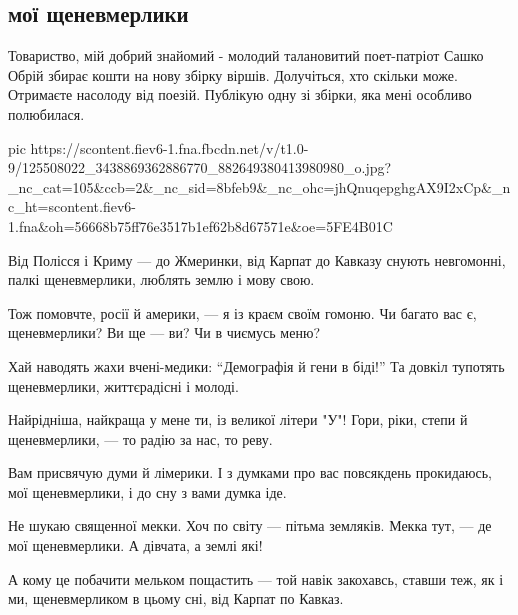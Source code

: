  
 
 
 
 
 
\subsection{мої щеневмерлики}
\label{sec:14_11_2020.fb.nitsoi_larysa.1.she_ne_vmerlyki}

Товариство, мій добрий знайомий - молодий талановитий поет-патріот Сашко Обрій
збирає кошти на нову збірку віршів. Долучіться, хто скільки може. Отримаєте
насолоду від поезій. Публікую одну зі збірки, яка мені особливо полюбилася.

\ifcmt
pic https://scontent.fiev6-1.fna.fbcdn.net/v/t1.0-9/125508022_3438869362886770_882649380413980980_o.jpg?_nc_cat=105&ccb=2&_nc_sid=8bfeb9&_nc_ohc=jhQnuqepghgAX9I2xCp&_nc_ht=scontent.fiev6-1.fna&oh=56668b75ff76e3517b1ef62b8d67571e&oe=5FE4B01C
\fi

\begin{multicols}{2}
	\obeycr
Від Полісся і Криму --- до Жмеринки,
від Карпат до Кавказу снують
невгомонні, палкі щеневмерлики,
люблять землю і мову свою.

Тож помовчте, росії й америки, —
я із краєм своїм гомоню.
Чи багато вас є, щеневмерлики?
Ви  ще --- ви? Чи в чиємусь меню?

Хай наводять жахи вчені-медики:
\enquote{Демографія й гени в біді!}
Та довкіл тупотять щеневмерлики,
життєрадісні і молоді.

Найрідніша, найкраща у мене ти,
із великої літери "У"!
Гори, ріки, степи й щеневмерлики, —
то радію за нас, то реву.

Вам присвячую думи й лімерики.
І з думками про вас повсякдень
прокидаюсь, мої щеневмерлики,
і до сну з вами думка іде. 

Не шукаю священної мекки.
Хоч по світу --- пітьма земляків.
Мекка тут, --- де мої щеневмерлики.
А дівчата, а землі які!

А кому це побачити мельком
пощастить --- той навік закохавсь,
ставши теж, як і ми, щеневмерликом
в цьому сні, від Карпат по Кавказ.
	\restorecr
\end{multicols}
